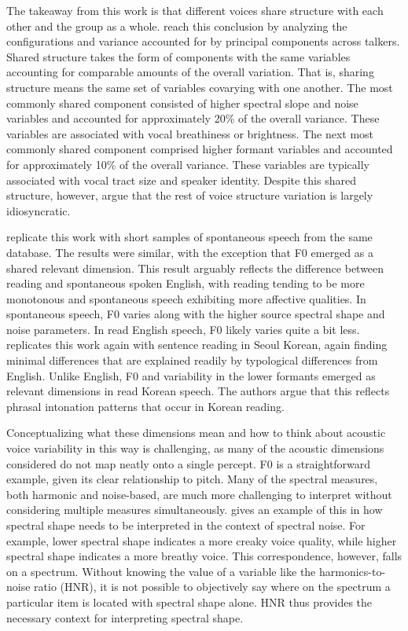The takeaway from this work is that different voices share structure with each other and the group as a whole. \citet{lee_2019_acoustic} reach this conclusion by analyzing the configurations and variance accounted for by principal components across talkers. Shared structure takes the form of components with the same variables accounting for comparable amounts of the overall variation. That is, sharing structure means the same set of variables covarying with one another. The most commonly shared component consisted of higher spectral slope and noise variables and accounted for approximately 20\% of the overall variance. These variables are associated with vocal breathiness or brightness. The next most commonly shared component comprised higher formant variables and accounted for approximately 10\% of the overall variance. These variables are typically associated with vocal tract size and speaker identity. Despite this shared structure, however, \citet{lee_2019_acoustic} argue that the rest of voice structure variation is largely idiosyncratic. 

\citet{lee_2019_spontaneous} replicate this work with short samples of spontaneous speech from the same database. The results were similar, with the exception that F0 emerged as a shared relevant dimension. This result arguably reflects the difference between reading and spontaneous spoken English, with reading tending to be more monotonous and spontaneous speech exhibiting more affective qualities. In spontaneous speech, F0 varies along with the higher source spectral shape and noise parameters. In read English speech, F0 likely varies quite a bit less. \citet{lee_2020_language} replicates this work again with sentence reading in Seoul Korean, again finding minimal differences that are explained readily by typological differences from English. Unlike English, F0 and variability in the lower formants emerged as relevant dimensions in read Korean speech. The authors argue that this reflects phrasal intonation patterns that occur in Korean reading. 

Conceptualizing what these dimensions mean and how to think about acoustic voice variability in this way is challenging, as many of the acoustic dimensions considered do not map neatly onto a single percept. F0 is a straightforward example, given its clear relationship to pitch. Many of the spectral measures, both harmonic and noise-based, are much more challenging to interpret without considering multiple measures simultaneously. \citet{garellek_2019_voice} gives an example of this in how spectral shape needs to be interpreted in the context of spectral noise. For example, lower spectral shape indicates a more creaky voice quality, while higher spectral shape indicates a more breathy voice. This correspondence, however, falls on a spectrum. Without knowing the value of a variable like the harmonics-to-noise ratio (HNR), it is not possible to objectively say where on the spectrum a particular item is located with spectral shape alone. HNR thus provides the necessary context for interpreting spectral shape. 

